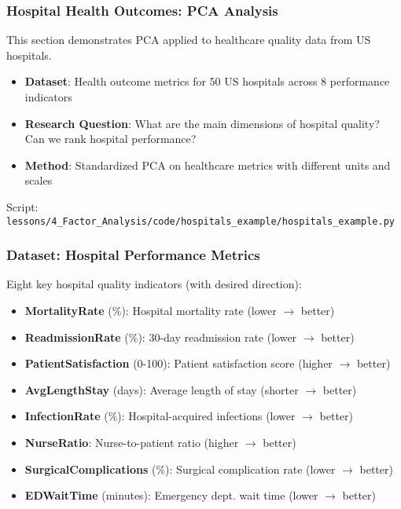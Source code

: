 \documentclass[aspectratio=169]{beamer}
\begin{document}
\begin{frame}
    \frametitle{Hospital Health Outcomes: PCA Analysis}
    This section demonstrates PCA applied to healthcare quality data from US hospitals.
    \begin{itemize}
        \item \textbf{Dataset}: Health outcome metrics for 50 US hospitals across 8 performance indicators \pause
        \item \textbf{Research Question}: What are the main dimensions of hospital quality? Can we rank hospital performance? \pause
        \item \textbf{Method}: Standardized PCA on healthcare metrics with different units and scales \pause
    \end{itemize}
    \vspace{6pt}
    Script: \texttt{lessons/4\_Factor\_Analysis/code/hospitals\_example/hospitals\_example.py}
\end{frame}

\begin{frame}
    \frametitle{Dataset: Hospital Performance Metrics}
    Eight key hospital quality indicators (with desired direction):
    \begin{itemize}
        \item \textbf{MortalityRate} (\%): Hospital mortality rate (lower $\rightarrow$ better) \pause
        \item \textbf{ReadmissionRate} (\%): 30-day readmission rate (lower $\rightarrow$ better) \pause
        \item \textbf{PatientSatisfaction} (0-100): Patient satisfaction score (higher $\rightarrow$ better) \pause
        \item \textbf{AvgLengthStay} (days): Average length of stay (shorter $\rightarrow$ better) \pause
        \item \textbf{InfectionRate} (\%): Hospital-acquired infections (lower $\rightarrow$ better) \pause
        \item \textbf{NurseRatio}: Nurse-to-patient ratio (higher $\rightarrow$ better) \pause
        \item \textbf{SurgicalComplications} (\%): Surgical complication rate (lower $\rightarrow$ better) \pause
        \item \textbf{EDWaitTime} (minutes): Emergency dept. wait time (lower $\rightarrow$ better) \pause
    \end{itemize}
\end{frame}
\end{document}
